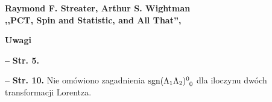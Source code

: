 \documentclass[a4paper,11pt]{article}
\newcommand{\spaceTwo}{2em}
\newcommand{\spaceFour}{0.5em}
\newcommand{\ld}{\ldots}
\newcommand{\mr}{\mathrm}
\newcommand{\La}{\Lambda}
\newcommand{\ten}{\tensor}
\newcommand{\sgn}{\mr{sgn}}
\newcommand{\tb}{\textbf}
\newcommand{\noi}{\noindent}
\newcommand{\start}{\noi \tb{--} {}}
\newcommand{\Str}[1]{\tb{Str. #1.}}
\newcommand{\Center}[1]{\begin{center} #1 \end{center}}
\newcommand{\CenterTB}[1]{\Center{\tb{#1}}}
\newcommand{\Work}[1]{ \begin{center} {\large \tb{#1}} \end{center} }
\begin{document}







\Work{
  Raymond F. Streater, Arthur S. Wightman \\
  ,,PCT, Spin and Statistic, and All That'',
  \cite{StreaterWightmanPCT00} }


\CenterTB{Uwagi}

\start \Str{5}

\vspace{\spaceFour}


\start \Str{10} Nie omówiono zagadnienia
$\sgn\ten{( \La_{ 1 } \La_{ 2 } )}{^0_0}$ dla iloczynu dwóch
transformacji Lorentza.










\end{document}
